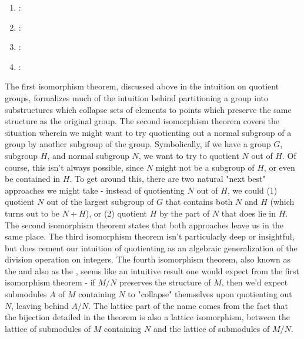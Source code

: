 \documentclass{article}
\begin{document}
\begin{enumerate}
    \item {}: 
    \item {}: 
    \item {}: 
    \item {}: 
\end{enumerate}
The first isomorphism theorem, discussed above in the intuition on quotient groups, formalizes much of the intuition behind partitioning a group into substructures which collapse sets of elements to points which preserve the same structure as the original group. The second isomorphism theorem covers the situation wherein we might want to try quotienting out a normal subgroup of a group by another subgroup of the group. Symbolically, if we have a group $ G $, subgroup $ H $, and normal subgroup $ N $, we want to try to quotient $ N $ out of $ H $. Of course, this isn't always possible, since $ N $ might not be a subgroup of $ H $, or even be contained in $ H $. To get around this, there are two natural "next best" approaches we might take - instead of quotienting $ N $ out of $ H $, we could (1) quotient $ N $ out of the largest subgroup of $ G $ that contains both $ N $ and $ H $ (which turns out to be $ N + H $), or (2) quotient $ H $ by the part of $ N $ that does lie in $ H $. The second isomorphism theorem states that both approaches leave us in the same place. The third isomorphism theorem isn't particularly deep or insightful, but does cement our intuition of quotienting as an algebraic generalization of the division operation on integers. The fourth isomorphism theorem, also known as the  and also as the , seems like an intuitive result one would expect from the first isomorphism theorem - if $ M / N $ preserves the structure of $ M $, then we'd expect submodules $ A $ of $ M $ containing $ N $ to "collapse" themselves upon quotienting out $ N $, leaving behind $ A / N $. The lattice part of the name comes from the fact that the bijection detailed in the theorem is also a lattice isomorphism, between the lattice of submodules of $ M $ containing $ N $ and the lattice of submodules of $ M / N $.
\end{document}
